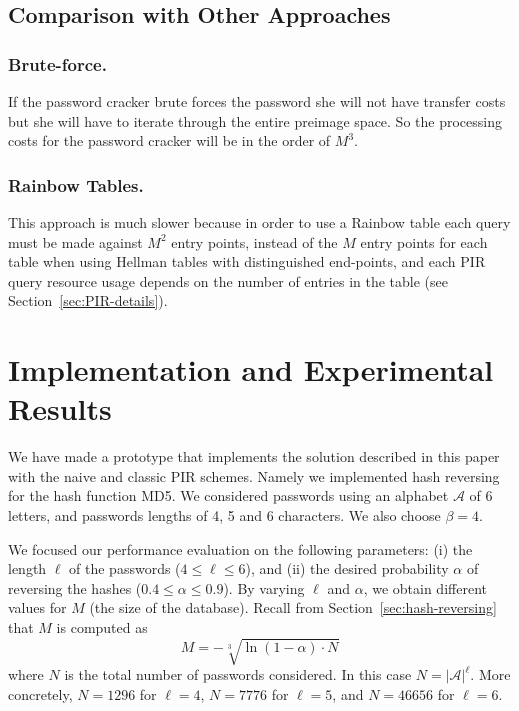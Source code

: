 \documentclass{llncs}
\def \CalA {\mathcal{A}}
\begin{document}
\subsection{Comparison with Other Approaches} \label{sec:comparison}


\subsubsection{Brute-force.}

If the password cracker brute forces the password she will not have
transfer costs but she will have to iterate through the entire preimage
space. So the processing costs for the password cracker will be in
the order of $M^{3}$.


\subsubsection{Rainbow Tables.}

This approach is much slower because in order to use a Rainbow table
each query must be made against $M^{2}$ entry points, instead of
the $M$ entry points for each table when using Hellman tables with
distinguished end-points, and each PIR query resource usage depends
on the number of entries in the table (see Section~\ref{sec:PIR-details}).



\section{Implementation and Experimental Results}
\label{sec:experimental-results}

We have made a prototype that implements the solution described in this paper with
the naive and classic PIR schemes. 
Namely we implemented hash reversing for the hash function MD5. 
We considered passwords using an alphabet $\CalA$ of 6 letters,
and passwords lengths of 4, 5 and 6 characters. We also choose $\beta = 4$.

We focused our performance evaluation on the following parameters:
(i) the length $\ell$ of the passwords ($ 4 \leq \ell \leq 6$), 
and  (ii) the desired probability $\alpha$ of reversing the 
hashes ($0.4 \leq \alpha \leq 0.9$).
By varying $\ell$ and $\alpha$, we obtain different values for $M$ 
(the size of the database). Recall from Section~\ref{sec:hash-reversing}
that $M$ is computed as
$$
M = -\sqrt[3]{ \ln(1-\alpha) \cdot N}
$$
where $N$ is the total number of passwords considered.
In this case $N = | \CalA | ^{\ell} $.
More concretely, $N = 1296$ for $\ell=4$, $N = 7776$ for $\ell = 5$,
and $N = 46656$ for $\ell = 6$.
\end{document}
